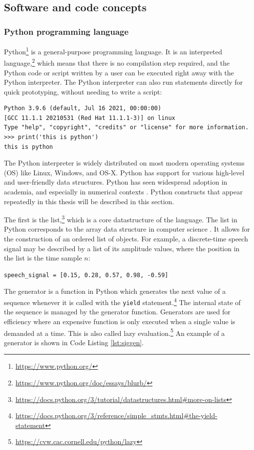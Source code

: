\documentclass[report.tex]{subfiles}
\begin{document}
\newpagefill

\subsection{Software and code concepts}
\label{sec:softcode}

\subsubsection{Python programming language}

Python\footnote{\url{https://www.python.org/}} is a general-purpose programming language. It is an interpreted language,\footnote{\url{https://www.python.org/doc/essays/blurb/}} which means that there is no compilation step required, and the Python code or script written by a user can be executed right away with the Python interpreter. The Python interpreter can also run statements directly for quick prototyping, without needing to write a script:

\begin{listing}[!ht]
\centering
\begin{BVerbatim}
Python 3.9.6 (default, Jul 16 2021, 00:00:00)
[GCC 11.1.1 20210531 (Red Hat 11.1.1-3)] on linux
Type "help", "copyright", "credits" or "license" for more information.
>>> print('this is python')
this is python
\end{BVerbatim}
\end{listing}

The Python interpreter is widely distributed on most modern operating systems (OS) like Linux, Windows, and OS-X. Python has support for various high-level and user-friendly data structures. Python has seen widespread adoption in academia, and especially in numerical contexts \parencite{pythonscience}. Python constructs that appear repeatedly in this thesis will be described in this section.

The first is the list,\footnote{\url{https://docs.python.org/3/tutorial/datastructures.html\#more-on-lists}} which is a core datastructure of the language. The list in Python corresponds to the array data structure in computer science \parencite{skiena}. It allows for the construction of an ordered list of objects. For example, a discrete-time speech signal may be described by a list of its amplitude values, where the position in the list is the time sample $n$:

\hfill \Verb#speech_signal = [0.15, 0.28, 0.57, 0.98, -0.59]#

The generator is a function in Python which generates the next value of a sequence whenever it is called with the \Verb#yield# statement.\footnote{\url{https://docs.python.org/3/reference/simple_stmts.html\#the-yield-statement}} The internal state of the sequence is managed by the generator function. Generators are used for efficiency where an expensive function is only executed when a single value is demanded at a time. This is also called lazy evaluation.\footnote{\url{https://cvw.cac.cornell.edu/python/lazy}} An example of a generator is shown in Code Listing \ref{lst:siggen}.
\end{document}
